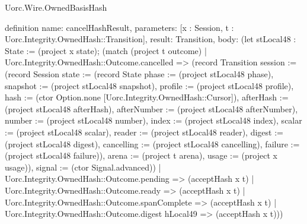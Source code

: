 \begin{lexlean}{Uorc.Wire.OwnedBasisHash}
\begin{semanticmodule}
definition{
  name: cancelHashResult,
  parameters: [x : Session, t : Uorc.Integrity.OwnedHash::Transition],
  result: Transition,
  body: (let stLocal48 : State := (project x state); (match (project t outcome)
    | Uorc.Integrity.OwnedHash::Outcome.cancelled => (record Transition {session := (record Session {state := (record State {phase := (project stLocal48 phase), snapshot := (project stLocal48 snapshot), profile := (project stLocal48 profile), hash := (ctor Option.none [Uorc.Integrity.OwnedHash::Cursor]), afterHash := (project stLocal48 afterHash), afterNumber := (project stLocal48 afterNumber), number := (project stLocal48 number), index := (project stLocal48 index), scalar := (project stLocal48 scalar), reader := (project stLocal48 reader), digest := (project stLocal48 digest), cancelling := (project stLocal48 cancelling), failure := (project stLocal48 failure)}), arena := (project t arena), usage := (project x usage)}), signal := (ctor Signal.advanced)})
    | Uorc.Integrity.OwnedHash::Outcome.pending => (acceptHash x t)
    | Uorc.Integrity.OwnedHash::Outcome.ready => (acceptHash x t)
    | Uorc.Integrity.OwnedHash::Outcome.spanComplete => (acceptHash x t)
    | Uorc.Integrity.OwnedHash::Outcome.digest hLocal49 => (acceptHash x t)))
}


\end{semanticmodule}
\end{lexlean}
